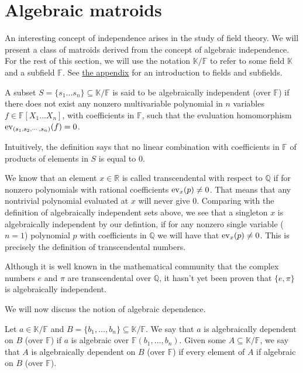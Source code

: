 \newpage

\section{Algebraic matroids}\label{sec:algebraic-matroids}

An interesting concept of independence arises in the study of field theory. We will present a class of matroids derived from the concept of algebraic independence. For the rest of this section, we will use the notation $\mathbb K / \mathbb F$ to refer to some field $\mathbb K$ and a subfield $\mathbb F$. See \hyperref[sec:appendix-fields]{the appendix} for an introduction to fields and subfields.

\begin{defn}
	A subset $S = \{ s_1 \ldots s _n \} \subseteq \mathbb K / \mathbb F$ is said to be algebraically independent (over $\mathbb F$) if there does not exist any
	nonzero multivariable polynomial in $n$ variables $f \in \mathbb{F}[X _1 \ldots X _n]$, with coefficients in $\mathbb{F} $, such that the evaluation homomorphism $\mathrm{ev}_{(s_1, s_2,\cdots,s_n)}(f) = 0$.
\end{defn}
Intuitively, the definition says that no linear combination with coefficients in $\mathbb F$ of products of elements in $S$ is equal to $0$.

We know that an element $x\in \mathbb{R}$ is called transcendental with respect to $\mathbb{Q}$ if for nonzero polynomials with rational coefficients $\mathrm{ev}_{x}(p) \neq 0$. That means that any nontrivial polynomial evaluated at $x$ will never give 0.
Comparing with the definition of algebraically independent sets above, we see that a singleton ${x}$ is algebraically independent by our defintion, if for any nonzero  single variable ($n = 1$) polynomial $p$ with coefficients in $\mathbb{Q}$ we will have that $\mathrm{ev}_{x}(p) \neq 0$. This is precisely the definition of transcendental numbers.

Although it is well known in the mathematical community that the complex numbers $e$ and $\pi$ are transcendental over $\mathbb{Q}$, it hasn't yet been proven that $\{e, \pi \}$ is algebraically independent.

We will now discuss the notion of algebraic dependence.

\begin{defn}
	Let $a \in \mathbb K / \mathbb F$ and $B = \{b _1, \ldots, b _n \} \subseteq  \mathbb K / \mathbb F$. We say that $a$ is algebraically dependent on $B$ (over $ \mathbb{F} $) if $a$ is algebraic over $\mathbb F(b _1, \ldots, b _n )$. Given some $A \subseteq  \mathbb K / \mathbb{F} $, we say that $A$ is algebraically dependent on $B$ (over $\mathbb{F} $) if every element of $A$ if algebraic on $B$ (over $\mathbb{F} $).
\end{defn}

